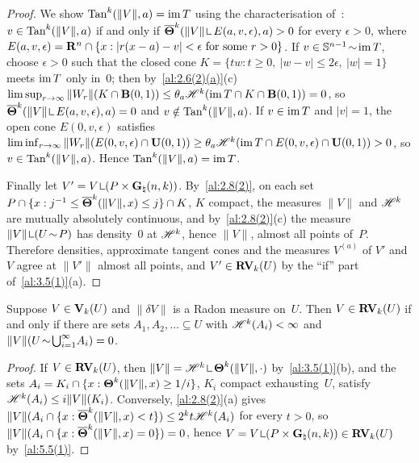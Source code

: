 \begin{proof}
    We show $\operatorname{Tan}^{k}(\|V\|,a) = \operatorname{im} T$ using the characterisation
    of~\cite[3.2.16]{Federer1969}: $v \in \operatorname{Tan}^{k}(\|V\|,a)$ if and only if
    $\udensity^{\vdim}(\|V\| \restrict E(a,v,\epsilon), a) > 0$ for every $\epsilon > 0$, where
    $E(a,v,\epsilon) = \mathbf{R}^{n} \cap \{ x : |r(x-a) - v| < \epsilon \text{ for some } r > 0 \}$. If $v \in \mathbb{S}^{n-1} \!\sim\! \operatorname{im} T$, choose $\epsilon > 0$
    such that the closed cone $K = \{ t w : t \ge 0,\ |w - v| \le 2\epsilon,\ |w| = 1 \}$ meets $\operatorname{im}
    T$ only in~$0$; then by~\ref{al:2.6(2)(a)}(c) $\limsup_{r \to \infty} \|W_r\|(K \cap
    \mathbf{B}(0,1)) \le \theta_a \mathscr{H}^{k}(\operatorname{im} T \cap K \cap \mathbf{B}(0,1)) = 0$, so
    $\udensity^{\vdim}(\|V\| \restrict E(a,v,\epsilon), a) = 0$ and $v \notin \operatorname{Tan}^{k}(\|V\|,a)$. If $v
    \in \operatorname{im} T$ and $|v| = 1$, the open cone $E(0,v,\epsilon)$ satisfies $\liminf_{r \to \infty}
    \|W_r\|(E(0,v,\epsilon) \cap \mathbf{U}(0,1)) \ge \theta_a \mathscr{H}^{k}(\operatorname{im} T \cap E(0,v,\epsilon)
    \cap \mathbf{U}(0,1)) > 0$, so $v \in \operatorname{Tan}^{k}(\|V\|,a)$. Hence $\operatorname{Tan}^{k}(\|V\|,a) = \operatorname{im} T$.

    Finally let $V' = V \restrict (P \times \pgrass{\adim}{\vdim})$. By~\ref{al:2.8(2)}, on each
    set $P \cap \{ x : j^{-1} \le \boldsymbol{\overline{\Theta}}^{k}(\|V\|,x) \le j \} \cap K$, $K$ compact, the
    measures $\|V\|$ and $\mathscr{H}^{k}$ are mutually absolutely continuous, and
    by~\ref{al:2.8(2)}(c) the measure $\|V\| \restrict (U \without P)$ has density~$0$ at
    $\mathscr{H}^{k}$, hence $\|V\|$, almost all points of~$P$. Therefore densities, approximate tangent
    cones and the measures $V^{(a)}$ of $V'$ and~$V$ agree at $\|V'\|$ almost all points, and
    $V' \in \mathbf{RV}_{k}(U)$ by the ``if'' part of~\ref{al:3.5(1)}(a).
\end{proof}

\begin{corollary}
    \label{al:5.5(2)}
    Suppose $V \in \mathbf{V}_{k}(U)$ and $\|\delta V\|$ is a Radon measure on~$U$. Then $V \in
    \mathbf{RV}_{k}(U)$ if and only if there are sets $A_1, A_2, \ldots \subseteq U$ with
    $\mathscr{H}^{k}(A_i) < \infty$ and $\|V\|(U \!\sim\! {{\textstyle \bigcup}}_{i=1}^\infty A_i) = 0$.
\end{corollary}

\begin{proof}
    If $V \in \mathbf{RV}_{k}(U)$, then $\|V\| = \HM^{\vdim} \restrict \density^{\vdim}(\|V\|,\cdot)$
    by~\ref{al:3.5(1)}(b), and the sets $A_i = K_i \cap \{ x : \boldsymbol{\Theta}^{k}(\|V\|,x) \ge 1/i
    \}$, $K_i$ compact exhausting~$U$, satisfy $\mathscr{H}^{k}(A_i) \le i \|V\|(K_i)$. Conversely,
    \ref{al:2.8(2)}(a) gives $\|V\|(A_i \cap \{ x : \boldsymbol{\overline{\Theta}}^{k}(\|V\|,x) < t \}) \le
    2^{k} t \mathscr{H}^{k}(A_i)$ for every $t > 0$, so $\|V\|(A_i \cap \{ x :
    \boldsymbol{\overline{\Theta}}^{k}(\|V\|,x) = 0 \}) = 0$, hence $V = V \restrict (P \times
    \pgrass{\adim}{\vdim}) \in \RVar{\vdim}(U)$ by~\ref{al:5.5(1)}.
\end{proof}

